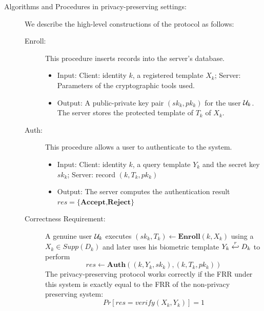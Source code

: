 \begin{description}
\item[Algorithms and Procedures in privacy-preserving settings:] We describe the high-level constructions of the protocol
  as follows:
  \begin{description}
  \item[Enroll:] This procedure inserts records into the server's database.
    \begin{itemize}
    \item Input: Client: identity $k$, a registered template $X_k$; Server: Parameters of the cryptographic tools used.
    \item Output: A public-private key pair $(sk_k, pk_k)$ for the user $\mathcal{U}_k$. The server stores the protected
      template of $T_k$ of $X_k$.
    \end{itemize}
  \item[Auth:] This procedure allows a user to authenticate to the system.
    \begin{itemize}
    \item Input: Client: identity $k$, a query template $Y_k$ and the secret key $sk_k$; Server: record $(k, T_k, pk_k)$
    \item Output: The server computes the authentication result $res=\{\textbf{Accept,Reject}\}$
    \end{itemize}

  \item[Correctness Requirement:] A genuine user $\mathcal{U}_k$ executes $(sk_k, T_k) \gets \mathbf{Enroll}(k, X_k)$ using a
    $X_k \in Supp(D_k)$ and later uses his biometric template $Y_k \stackrel{r}{\hookleftarrow} D_k$ to perform
    $$res \gets \mathbf{Auth}( (k, Y_k, sk_k), (k, T_k, pk_k))$$
    The privacy-preserving protocol works correctly if the FRR under this system is exactly equal to the FRR of the non-privacy
    preserving system:
    \[
      Pr[res = verify(X_k,Y_k)] = 1
    \]
  \end{description}
\end{description}

